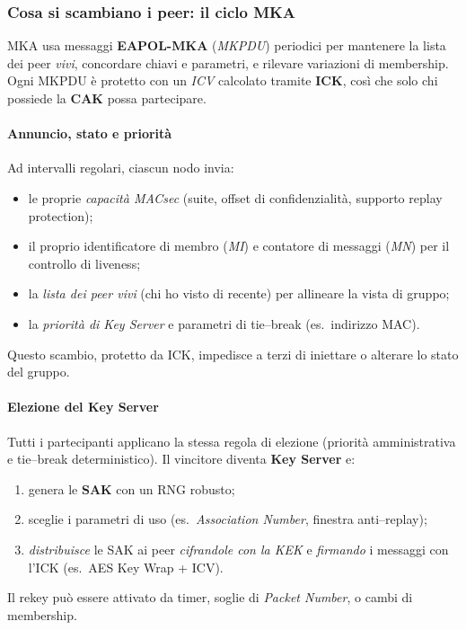\subsubsection{Cosa si scambiano i peer: il ciclo MKA}
MKA usa messaggi \textbf{EAPOL-MKA} (\emph{MKPDU}) periodici per mantenere la lista dei peer \emph{vivi}, concordare chiavi e parametri, e rilevare variazioni di membership. Ogni MKPDU è protetto con un \emph{ICV} calcolato tramite \textbf{ICK}, così che solo chi possiede la \textbf{CAK} possa partecipare.

\paragraph{Annuncio, stato e priorit\`a}
Ad intervalli regolari, ciascun nodo invia:
\begin{itemize}
  \item le proprie \emph{capacit\`a MACsec} (suite, offset di confidenzialit\`a, supporto replay protection);
  \item il proprio identificatore di membro (\emph{MI}) e contatore di messaggi (\emph{MN}) per il controllo di liveness;
  \item la \emph{lista dei peer vivi} (chi ho visto di recente) per allineare la vista di gruppo;
  \item la \emph{priorit\`a di Key Server} e parametri di tie–break (es.\ indirizzo MAC).
\end{itemize}
Questo scambio, protetto da ICK, impedisce a terzi di iniettare o alterare lo stato del gruppo.

\paragraph{Elezione del Key Server}
Tutti i partecipanti applicano la stessa regola di elezione (priorit\`a amministrativa e tie–break deterministico). Il vincitore diventa \textbf{Key Server} e:
\begin{enumerate}
  \item genera le \textbf{SAK} con un RNG robusto;
  \item sceglie i parametri di uso (es.\ \emph{Association Number}, finestra anti–replay);
  \item \emph{distribuisce} le SAK ai peer \emph{cifrandole con la KEK} e \emph{firmando} i messaggi con l'ICK (es.\ AES Key Wrap + ICV).
\end{enumerate}
Il rekey pu\`o essere attivato da timer, soglie di \emph{Packet Number}, o cambi di membership.

